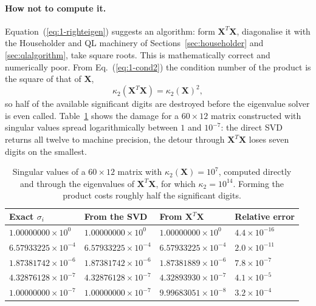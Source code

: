 \paragraph{How not to compute it.}
Equation~(\ref{eq:1-righteigen}) suggests an algorithm: form $\bm{X}^{T}\bm{X}$,
diagonalise it with the Householder and QL machinery of
Sections~\ref{sec:householder} and \ref{sec:qlalgorithm}, take square roots.
This is mathematically correct and numerically poor.  From
Eq.~(\ref{eq:1-cond2}) the condition number of the product is the square of
that of $\bm{X}$,
\begin{equation}
  \kappa_2(\bm{X}^{T}\bm{X}) = \kappa_2(\bm{X})^{2},
  \label{eq:1-condsquared}
\end{equation}
so half of the available significant digits are destroyed before the
eigenvalue solver is even called.  Table~\ref{tab:svdroute} shows the damage
for a $60\times 12$ matrix constructed with singular values spread
logarithmically between $1$ and $10^{-7}$: the direct SVD returns all twelve
to machine precision, the detour through $\bm{X}^{T}\bm{X}$ loses seven
digits on the smallest.

\begin{table}[h]
\centering
\renewcommand{\arraystretch}{1.25}
\setlength{\tabcolsep}{10pt}
\begin{tabular}{llll}
\toprule
\textbf{Exact $\sigma_i$} & \textbf{From the SVD} &
\textbf{From $\bm{X}^{T}\bm{X}$} & \textbf{Relative error}\\
\midrule
$1.00000000\times10^{0}$  & $1.00000000\times10^{0}$  & $1.00000000\times10^{0}$  & $4.4\times10^{-16}$\\
$6.57933225\times10^{-4}$ & $6.57933225\times10^{-4}$ & $6.57933225\times10^{-4}$ & $2.0\times10^{-11}$\\
$1.87381742\times10^{-6}$ & $1.87381742\times10^{-6}$ & $1.87381889\times10^{-6}$ & $7.8\times10^{-7}$\\
$4.32876128\times10^{-7}$ & $4.32876128\times10^{-7}$ & $4.32893930\times10^{-7}$ & $4.1\times10^{-5}$\\
$1.00000000\times10^{-7}$ & $1.00000000\times10^{-7}$ & $9.99683051\times10^{-8}$ & $3.2\times10^{-4}$\\
\bottomrule
\end{tabular}
\caption{Singular values of a $60\times12$ matrix with
$\kappa_2(\bm{X})=10^{7}$, computed directly and through the eigenvalues of
$\bm{X}^{T}\bm{X}$, for which $\kappa_2=10^{14}$.  Forming the product costs
roughly half the significant digits.}
\label{tab:svdroute}
\end{table}

